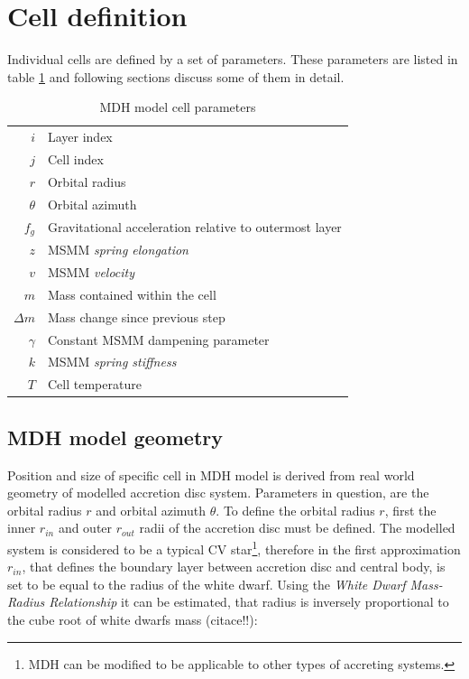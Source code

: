 \section{Cell definition}
Individual cells are defined by a set of parameters. These parameters are listed in table \ref{table:mdh_cell_parameters} and following sections discuss some of them in detail.

\begin{table}[h]
\begin{center}
\begin{tabular}{r|l}
$i$			& Layer index \\
$j$			& Cell index \\
$r$			& Orbital radius \\
$\theta$	& Orbital azimuth \\ 
$f_g$		& Gravitational acceleration relative to outermost layer \\
$z$			& MSMM \emph{spring elongation}  \\
$v$			& MSMM \emph{velocity} \\
$m$			& Mass contained within the cell \\
$\Delta m$ 	& Mass change since previous step \\
$\gamma$		& Constant MSMM dampening parameter \\
$k$			& MSMM \emph{spring stiffness} \\
$T$			& Cell temperature
\end{tabular}
\caption{MDH model cell parameters}
\label{table:mdh_cell_parameters}
\end{center}
\end{table}

\subsection{MDH model geometry}
Position and size of specific cell in MDH model is derived from real world geometry of modelled accretion disc system. Parameters in question, are the orbital radius $r$ and orbital azimuth $\theta$. To define the orbital radius $r$, first the inner $r_{in}$ and outer $r_{out}$ radii of the accretion disc must be defined. The modelled system is considered to be a typical CV star\footnote{MDH can be modified to be applicable to other types of accreting systems.}, therefore in the first approximation $r_{in}$, that defines the boundary layer between accretion disc and central body, is set to be equal to the radius of the white dwarf. Using the \emph{White Dwarf Mass-Radius Relationship} it can be estimated, that radius is inversely proportional to the cube root of white dwarfs mass (citace!!):

